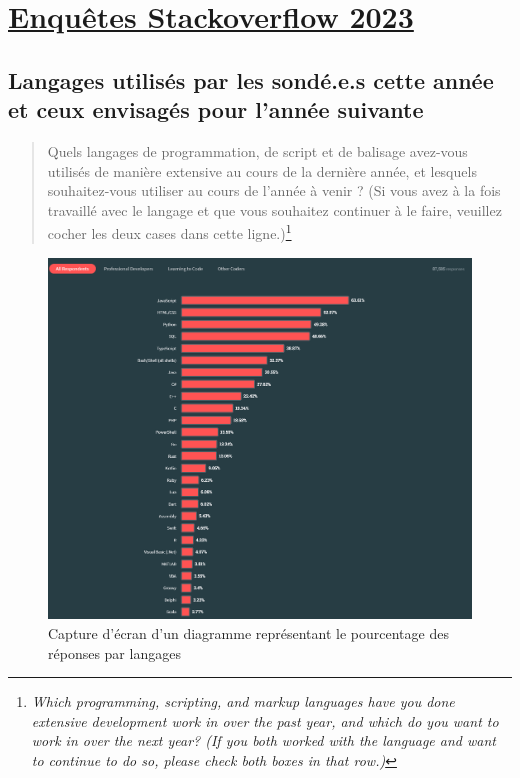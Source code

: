 \section{\href{https://survey.stackoverflow.co/2023/}{Enquêtes Stackoverflow 2023}}
\label{annexe:Ruby_stats}

\subsection{Langages utilisés par les sondé.e.s cette année et ceux envisagés pour l'année suivante}

\begin{quote}
    Quels langages de programmation, de script et de balisage avez-vous utilisés de manière extensive au cours de la dernière année, et lesquels souhaitez-vous utiliser au cours de l'année à venir ? (Si vous avez à la fois travaillé avec le langage et que vous souhaitez continuer à le faire, veuillez cocher les deux cases dans cette ligne.)\footnote{\textit{Which programming, scripting, and markup languages have you done extensive development work in over the past year, and which do you want to work in over the next year? (If you both worked with the language and want to continue to do so, please check both boxes in that row.)}}
\end{quote}


    \begin{figure}[H]
        \centering
        \includegraphics[width=15cm]{images/extrait_sondage_stackoverflow_languages.PNG}
        \caption{Capture d'écran d'un diagramme représentant le pourcentage des réponses par langages}
        \label{fig:StackoverflowLanguages}
    \end{figure}

